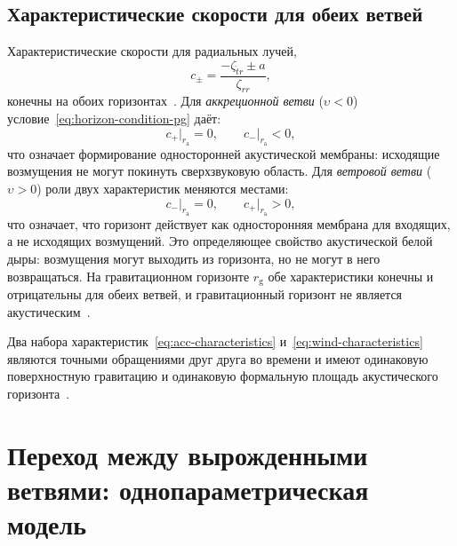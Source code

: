\documentclass[12pt,a4paper,preprint]{elsarticle}
\begin{document}
        \subsection{Характеристические скорости для обеих ветвей}\label{subsec:characteristics-both}
            Характеристические скорости для радиальных лучей,
            \begin{equation}
                c_{\pm} = \frac{-\zeta_{\check{t}r} \pm a}{\zeta_{rr}},
                \label{eq:characteristic-speeds}
            \end{equation}
            конечны на обоих горизонтах~\cite{SemyannikovAV_GlobalAcousticGeometryOfMichelFlowInPainleveGullstrandCoordinates_2026}. Для \emph{аккреционной ветви} ($\upsilon < 0$) условие~\eqref{eq:horizon-condition-pg} даёт:
            \begin{equation}
                c_{+}\big|_{r_{\mathrm{a}}} = 0, \qquad c_{-}\big|_{r_{\mathrm{a}}} < 0,
                \label{eq:acc-characteristics}
            \end{equation}
            что означает формирование односторонней акустической мембраны: исходящие возмущения не могут покинуть сверхзвуковую область. Для \emph{ветровой ветви} ($\upsilon > 0$) роли двух характеристик меняются местами:
            \begin{equation}
                c_{-}\big|_{r_{\mathrm{a}}} = 0, \qquad c_{+}\big|_{r_{\mathrm{a}}} > 0,
                \label{eq:wind-characteristics}
            \end{equation}
            что означает, что горизонт действует как односторонняя мембрана для входящих, а не исходящих возмущений. Это определяющее свойство акустической белой дыры: возмущения могут выходить из горизонта, но не могут в него возвращаться. На гравитационном горизонте $r_{\mathrm{g}}$ обе характеристики конечны и отрицательны для обеих ветвей, и гравитационный горизонт не является акустическим~\cite{SemyannikovAV_GlobalAcousticGeometryOfMichelFlowInPainleveGullstrandCoordinates_2026}.
            
            Два набора характеристик~\eqref{eq:acc-characteristics} и~\eqref{eq:wind-characteristics} являются точными обращениями друг друга во времени и имеют одинаковую поверхностную гравитацию и одинаковую формальную площадь акустического горизонта~\cite{SemyannikovAV_AcousticGeometryAndSoundRayDynamicsInRelativisticSphericalAccretion_2026}.

    \section{Переход между вырожденными ветвями: однопараметрическая модель}\label{sec:transition-model}
\end{document}
